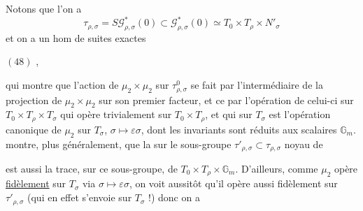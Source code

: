 
Notons que l'on a
\[
\tau_{\rho,\sigma}=S\mathcal G^*_{\rho,\sigma}(0)\subset\mathcal G^*_{\rho,\sigma}(0)\simeq T_0\times T_\rho\times N'_\sigma
\]
et on a un hom de suites exactes

\noindent$(48)$\quad
{},

qui montre que l'action de $\mu_2\times\mu_2$ sur \deleted{$\unsure{\tau}$} $\tau^0_{\rho,\sigma}$ se fait par l'intermédiaire de la projection de $\mu_2\times\mu_2$ sur son premier facteur, et ce par l'opération de celui-ci sur $T_0\times T_\rho\times T_\sigma$ qui opère trivialement sur $T_0\times T_\rho$, et qui sur $T_\sigma$ est l'opération canonique de $\mu_2$ sur $T_\sigma$, $\sigma\mapsto\varepsilon\sigma$, dont les invariants sont réduits aux scalaires $\mathbb G_m$.   montre, plus généralement, que la   sur le sous-groupe $\tau'_{\rho,\sigma}\subset\tau_{\rho,\sigma}$ noyau de


est aussi la trace, sur ce sous-groupe, de $T_0\times T_\rho\times\mathbb G_m$. D'ailleurs, comme $\mu_2$ opère \uline{fidèlement} sur $T_\sigma$ via $\sigma\mapsto\varepsilon\sigma$, on voit  aussitôt qu'il opère aussi fidèlement sur $\tau'_{\rho,\sigma}$ (qui en effet s'envoie \uline{} sur $T_\sigma$ !) donc on a

